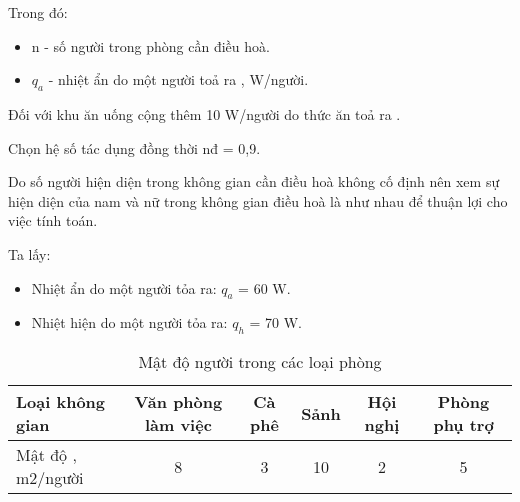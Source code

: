 Trong đó:
\begin{itemize}[leftmargin=2.2cm]
	\item n - số người trong phòng cần điều hoà.
	\item $q_{a}$ -  nhiệt ẩn do một người toả ra , W/người.
\end{itemize}

Đối với khu ăn uống cộng thêm 10 W/người do thức ăn toả ra .

Chọn hệ số tác dụng đồng thời n{\scriptsize đ} = 0,9.

Do số người hiện diện trong không gian cần điều hoà không cố định nên xem sự hiện diện của nam và nữ trong không gian điều hoà là như nhau để thuận lợi cho việc tính toán.

Ta lấy:
\begin{itemize}[leftmargin=2.2cm, label={-}]
	\item Nhiệt ẩn do một người tỏa ra: $q_{a}$ = 60 W.
	\item Nhiệt hiện do một người tỏa ra: $q_{h}$ = 70 W.
\end{itemize}

\begin{table}[H]
	\centering
	\caption{Mật độ người trong các loại phòng}
	\begin{adjustbox}{width=\textwidth}
	\begin{tabular}{|p{10.785em}|c|c|c|c|c|}
		\hline
		\textbf{Loại không  gian} & \multicolumn{1}{p{7.285em}|}{\textbf{Văn phòng làm việc}} & \multicolumn{1}{p{4.07em}|}{\textbf{Cà phê}} & \multicolumn{1}{p{4.07em}|}{\textbf{Sảnh}} & \multicolumn{1}{p{4.07em}|}{\textbf{Hội nghị}} & \multicolumn{1}{p{6.785em}|}{\textbf{Phòng phụ trợ}} \bigstrut\\
		\hline
		Mật độ , m2/người & 8        & 3        & 10       & 2        & 5 \bigstrut\\
		\hline
	\end{tabular}%
	\end{adjustbox}
	\label{b:mdn}%
\end{table}%

